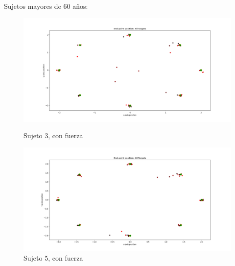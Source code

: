 \documentclass[a4paper,11pt, oneside]{book}
\begin{document}
Sujetos mayores de 60 años:

\begin{figure}[H]
	\begin{minipage}[b]{0.5\linewidth}
		\centering
		\includegraphics[width=\linewidth]{sujeto3/force/trayectorias_puntos}
		\caption{Sujeto 3, con fuerza}
		\label{fig:figura1}
	\end{minipage}
	\hspace{0.5cm}
	\begin{minipage}[b]{0.5\linewidth}
		\centering
		\includegraphics[width=\linewidth]{sujeto5/force/trayectorias_puntos}
		\caption{Sujeto 5, con fuerza}
		\label{fig:figura2}
	\end{minipage}
\end{figure}
\end{document}

